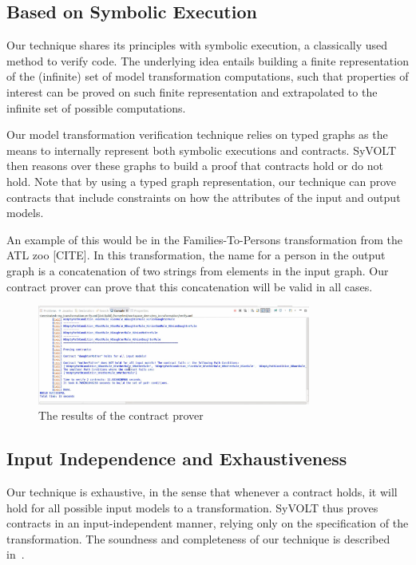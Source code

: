 \subsection{Based on Symbolic Execution}

Our technique shares its principles with symbolic execution, a
classically used method to verify code. The underlying idea entails building a
finite representation of the (infinite) set of model transformation
computations, such that properties of interest can be proved on such finite
representation and extrapolated to the infinite set of possible computations.

Our model transformation verification technique relies on typed graphs as the
means to internally represent both symbolic executions and contracts. SyVOLT
then reasons over these graphs to build a proof that contracts hold or do not
hold. Note that by using a typed graph representation, our technique can prove
contracts that include constraints on how the attributes of the input and output
models.

 An example of this would be in the
Families-To-Persons transformation from the ATL zoo [CITE]. In this transformation, the name for a person in the
output graph is a concatenation of two strings  from elements in the input graph. Our contract prover
can prove that this concatenation will be valid in all cases.

\begin{figure}
\centering
\includegraphics[width=0.8\textwidth]{figures/output}
\caption{The results of the contract prover}
\label{fig:output}
\end{figure}

\subsection{Input Independence and Exhaustiveness} 

Our technique is exhaustive, in the sense that whenever a contract holds, it
will hold for all possible input models to a transformation. SyVOLT thus proves
contracts in an input-independent manner, relying only on the specification of
the transformation. The soundness and completeness of our technique is described
in~\cite{Lucio2014}.

